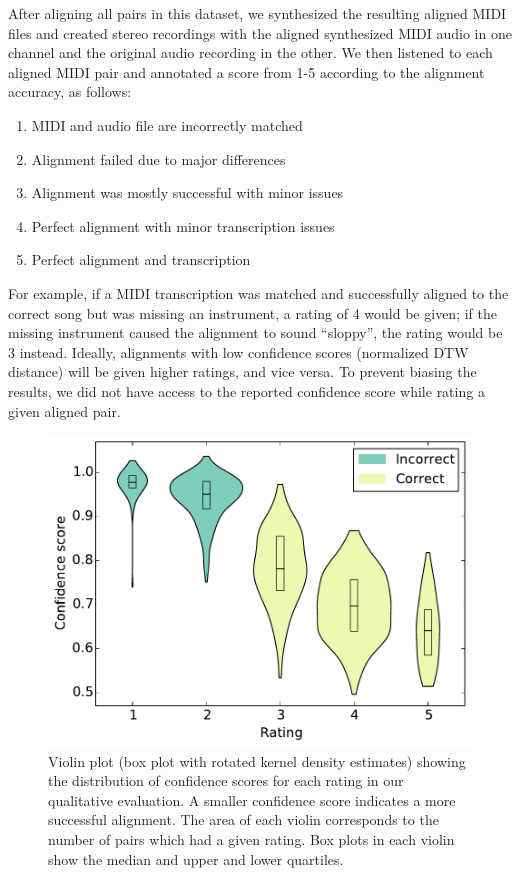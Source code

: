 \documentclass{article}
\begin{document}
After aligning all pairs in this dataset, we synthesized the resulting aligned MIDI files and created stereo recordings with the aligned synthesized MIDI audio in one channel and the original audio recording in the other.
We then listened to each aligned MIDI pair and annotated a score from 1-5 according to the alignment accuracy, as follows:
\begin{enumerate}[topsep=1pt,itemsep=-1pt]
\item MIDI and audio file are incorrectly matched
\item Alignment failed due to major differences
\item Alignment was mostly successful with minor issues
\item Perfect alignment with minor transcription issues
\item Perfect alignment and transcription
\end{enumerate}
For example, if a MIDI transcription was matched and successfully aligned to the correct song but was missing an instrument, a rating of 4 would be given; if the missing instrument caused the alignment to sound ``sloppy'', the rating would be 3 instead.
Ideally, alignments with low confidence scores (normalized DTW distance) will be given higher ratings, and vice versa.
To prevent biasing the results, we did not have access to the reported confidence score while rating a given aligned pair.

\begin{figure}[t]
  \centering
  \includegraphics[width=\columnwidth]{violin.pdf}
  \caption{Violin plot (box plot with rotated kernel density estimates) showing the distribution of confidence scores for each rating in our qualitative evaluation.
A smaller confidence score indicates a more successful alignment.
The area of each violin corresponds to the number of pairs which had a given rating.
Box plots in each violin show the median and upper and lower quartiles.}
  \label{fig:violin}
\end{figure}
\end{document}
